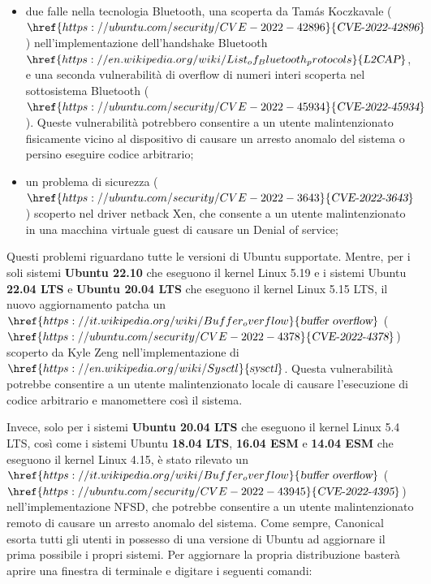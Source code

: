 \documentclass[a4paper,twoside]{article}
\begin{document}
\begin{itemize}
\item due falle nella tecnologia Bluetooth, una scoperta da Tamás Koczkavale ($\href{https://ubuntu.com/security/CVE-2022-42896}{\textsl{CVE-2022-42896}}$) nell'implementazione dell'handshake Bluetooth $\href{https://en.wikipedia.org/wiki/List_of_Bluetooth_protocols}{\textsl{L2CAP}}$, e una seconda vulnerabilità di overflow di numeri interi scoperta nel sottosistema Bluetooth ($\href{https://ubuntu.com/security/CVE-2022-45934}{\textsl{CVE-2022-45934}}$). Queste vulnerabilità potrebbero consentire a un utente malintenzionato fisicamente vicino al dispositivo di causare un arresto anomalo del sistema o persino eseguire codice arbitrario;
\item un problema di sicurezza ($\href{https://ubuntu.com/security/CVE-2022-3643}{\textsl{CVE-2022-3643}}$) scoperto nel driver netback Xen, che consente a un utente malintenzionato in una macchina virtuale guest di causare un Denial of service;
\end{itemize}

Questi problemi riguardano tutte le versioni di Ubuntu supportate. Mentre, per i soli sistemi \textbf{Ubuntu 22.10} che eseguono il kernel Linux 5.19 e i sistemi Ubuntu \textbf{22.04 LTS} e \textbf{Ubuntu 20.04 LTS} che eseguono il kernel Linux 5.15 LTS, il nuovo aggiornamento patcha un $\href{https://it.wikipedia.org/wiki/Buffer_overflow}{\textsl{buffer overflow}}$ ($\href{https://ubuntu.com/security/CVE-2022-4378}{\textsl{CVE-2022-4378}}$) scoperto da Kyle Zeng nell'implementazione di $\href{https://en.wikipedia.org/wiki/Sysctl}{\textsl{sysctl}}$. Questa vulnerabilità potrebbe consentire a un utente malintenzionato locale di causare l'esecuzione di codice arbitrario e manomettere così il sistema.

Invece, solo per i sistemi \textbf{Ubuntu 20.04 LTS} che eseguono il kernel Linux 5.4 LTS, così come i sistemi Ubuntu \textbf{18.04 LTS}, \textbf{16.04 ESM} e \textbf{14.04 ESM} che eseguono il kernel Linux 4.15, è stato rilevato un $\href{https://it.wikipedia.org/wiki/Buffer_overflow}{\textsl{buffer overflow}}$ ($\href{https://ubuntu.com/security/CVE-2022-43945}{\textsl{CVE-2022-4395}}$) nell'implementazione NFSD, che potrebbe consentire a un utente malintenzionato remoto di causare un arresto anomalo del sistema. Come sempre, Canonical esorta tutti gli utenti in possesso di una versione di Ubuntu ad aggiornare il prima possibile i propri sistemi. Per aggiornare la propria distribuzione basterà aprire una finestra di terminale e digitare i seguenti comandi:
\end{document}
